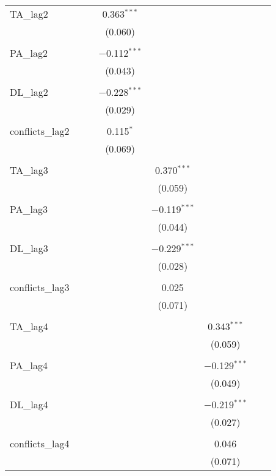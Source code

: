 \begin{table}[!htbp]
\begin{tabular}{@{\extracolsep{5pt}}lccccccc}
 TA\_lag2 &  &  & 0.363$^{***}$ &  &  &  &  \\ 
  &  &  & (0.060) &  &  &  &  \\ 
  & & & & & & & \\ 
 PA\_lag2 &  &  & $-$0.112$^{***}$ &  &  &  &  \\ 
  &  &  & (0.043) &  &  &  &  \\ 
  & & & & & & & \\ 
 DL\_lag2 &  &  & $-$0.228$^{***}$ &  &  &  &  \\ 
  &  &  & (0.029) &  &  &  &  \\ 
  & & & & & & & \\ 
 conflicts\_lag2 &  &  & 0.115$^{*}$ &  &  &  &  \\ 
  &  &  & (0.069) &  &  &  &  \\ 
  & & & & & & & \\ 
 TA\_lag3 &  &  &  & 0.370$^{***}$ &  &  &  \\ 
  &  &  &  & (0.059) &  &  &  \\ 
  & & & & & & & \\ 
 PA\_lag3 &  &  &  & $-$0.119$^{***}$ &  &  &  \\ 
  &  &  &  & (0.044) &  &  &  \\ 
  & & & & & & & \\ 
 DL\_lag3 &  &  &  & $-$0.229$^{***}$ &  &  &  \\ 
  &  &  &  & (0.028) &  &  &  \\ 
  & & & & & & & \\ 
 conflicts\_lag3 &  &  &  & 0.025 &  &  &  \\ 
  &  &  &  & (0.071) &  &  &  \\ 
  & & & & & & & \\ 
 TA\_lag4 &  &  &  &  & 0.343$^{***}$ &  &  \\ 
  &  &  &  &  & (0.059) &  &  \\ 
  & & & & & & & \\ 
 PA\_lag4 &  &  &  &  & $-$0.129$^{***}$ &  &  \\ 
  &  &  &  &  & (0.049) &  &  \\ 
  & & & & & & & \\ 
 DL\_lag4 &  &  &  &  & $-$0.219$^{***}$ &  &  \\ 
  &  &  &  &  & (0.027) &  &  \\ 
  & & & & & & & \\ 
 conflicts\_lag4 &  &  &  &  & 0.046 &  &  \\ 
  &  &  &  &  & (0.071) &  &  \\ 

\end{tabular}
\end{table}
